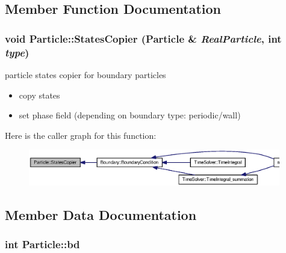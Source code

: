 \subsection{Member Function Documentation}
\hypertarget{classParticle_d202d28edab1253eb51be75ea0cbdbfd}{
\subsubsection[{StatesCopier}]{\setlength{\rightskip}{0pt plus 5cm}void Particle::StatesCopier ({\bf Particle} \& {\em RealParticle}, \/  int {\em type})}}
\label{classParticle_d202d28edab1253eb51be75ea0cbdbfd}


particle states copier for boundary particles 



\begin{itemize}
\item copy states\end{itemize}


\begin{itemize}
\item set phase field (depending on boundary type: periodic/wall) \end{itemize}


Here is the caller graph for this function:\nopagebreak
\begin{figure}[H]
\begin{center}
\leavevmode
\includegraphics[width=312pt]{classParticle_d202d28edab1253eb51be75ea0cbdbfd_icgraph}
\end{center}
\end{figure}


\subsection{Member Data Documentation}
\hypertarget{classParticle_873301ecb921ab815ef7b693033e8c88}{
\subsubsection[{bd}]{\setlength{\rightskip}{0pt plus 5cm}int {\bf Particle::bd}}}
\label{classParticle_873301ecb921ab815ef7b693033e8c88}


